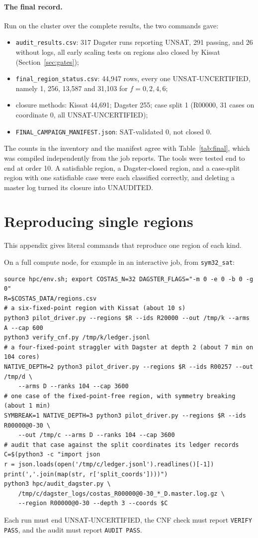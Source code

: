 \documentclass[11pt,a4paper]{article}
\theoremstyle{definition}
\newcommand{\code}[1]{\texttt{#1}}
\newcommand{\st}[1]{\textsf{#1}}
\begin{document}
\paragraph{The final record.} Run on the cluster over the complete results, the two commands
gave:
\begin{itemize}
\item \code{audit\_results.csv}: 317 Dagster runs reporting UNSAT, 291 passing, and 26 without
logs, all early scaling tests on regions also closed by Kissat (Section~\ref{sec:gates});
\item \code{final\_region\_status.csv}: 44{,}947 rows, every one \st{UNSAT-UNCERTIFIED}, namely
1, 256, 13{,}587 and 31{,}103 for $f=0,2,4,6$;
\item closure methods: Kissat 44{,}691; Dagster 255; case split 1 (R00000, 31 cases on
coordinate 0, all \st{UNSAT-UNCERTIFIED});
\item \code{FINAL\_CAMPAIGN\_MANIFEST.json}: SAT-validated 0, not closed 0.
\end{itemize}
The counts in the inventory and the manifest agree with Table~\ref{tab:final}, which was
compiled independently from the job reports. The tools were tested end to end at order 10. A satisfiable region, a Dagster-closed region,
and a case-split region with one satisfiable case were each classified correctly, and deleting a
master log turned its closure into \st{UNAUDITED}.

\section{Reproducing single regions}\label{app:single}
This appendix gives literal commands that reproduce one region of each kind.

On a full compute node, for example in an interactive job, from \code{sym32\_sat}:
{\footnotesize
\begin{verbatim}
source hpc/env.sh; export COSTAS_N=32 DAGSTER_FLAGS="-m 0 -e 0 -b 0 -g 0"
R=$COSTAS_DATA/regions.csv
# a six-fixed-point region with Kissat (about 10 s)
python3 pilot_driver.py --regions $R --ids R20000 --out /tmp/k --arms A --cap 600
python3 verify_cnf.py /tmp/k/ledger.jsonl
# a four-fixed-point straggler with Dagster at depth 2 (about 7 min on 104 cores)
NATIVE_DEPTH=2 python3 pilot_driver.py --regions $R --ids R00257 --out /tmp/d \
    --arms D --ranks 104 --cap 3600
# one case of the fixed-point-free region, with symmetry breaking (about 1 min)
SYMBREAK=1 NATIVE_DEPTH=3 python3 pilot_driver.py --regions $R --ids R00000@0-30 \
    --out /tmp/c --arms D --ranks 104 --cap 3600
# audit that case against the split coordinates its ledger records
C=$(python3 -c "import json
r = json.loads(open('/tmp/c/ledger.jsonl').readlines()[-1])
print(','.join(map(str, r['split_coords'])))")
python3 hpc/audit_dagster.py \
    /tmp/c/dagster_logs/costas_R00000@0-30_*_D.master.log.gz \
    --region R00000@0-30 --depth 3 --coords $C
\end{verbatim}}
Each run must end \st{UNSAT-UNCERTIFIED}, the CNF check must report \code{VERIFY PASS}, and the
audit must report \code{AUDIT PASS}.
\end{document}
